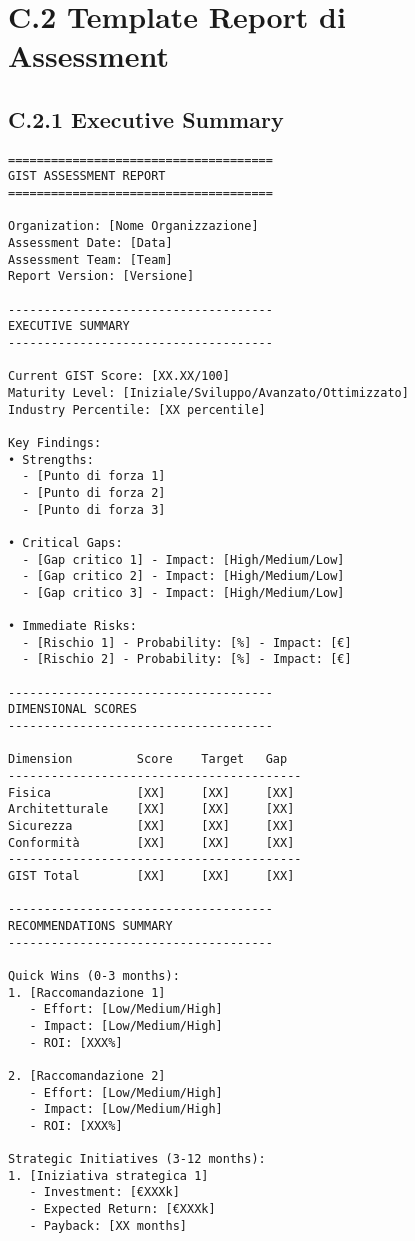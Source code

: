 \section{C.2 Template Report di Assessment}

\subsection{C.2.1 Executive Summary}

\begin{verbatim}
=====================================
GIST ASSESSMENT REPORT
=====================================

Organization: [Nome Organizzazione]
Assessment Date: [Data]
Assessment Team: [Team]
Report Version: [Versione]

-------------------------------------
EXECUTIVE SUMMARY
-------------------------------------

Current GIST Score: [XX.XX/100]
Maturity Level: [Iniziale/Sviluppo/Avanzato/Ottimizzato]
Industry Percentile: [XX percentile]

Key Findings:
• Strengths:
  - [Punto di forza 1]
  - [Punto di forza 2]
  - [Punto di forza 3]

• Critical Gaps:
  - [Gap critico 1] - Impact: [High/Medium/Low]
  - [Gap critico 2] - Impact: [High/Medium/Low]
  - [Gap critico 3] - Impact: [High/Medium/Low]

• Immediate Risks:
  - [Rischio 1] - Probability: [%] - Impact: [€]
  - [Rischio 2] - Probability: [%] - Impact: [€]

-------------------------------------
DIMENSIONAL SCORES
-------------------------------------

Dimension         Score    Target   Gap
-----------------------------------------
Fisica            [XX]     [XX]     [XX]
Architetturale    [XX]     [XX]     [XX]
Sicurezza         [XX]     [XX]     [XX]
Conformità        [XX]     [XX]     [XX]
-----------------------------------------
GIST Total        [XX]     [XX]     [XX]

-------------------------------------
RECOMMENDATIONS SUMMARY
-------------------------------------

Quick Wins (0-3 months):
1. [Raccomandazione 1]
   - Effort: [Low/Medium/High]
   - Impact: [Low/Medium/High]
   - ROI: [XXX%]

2. [Raccomandazione 2]
   - Effort: [Low/Medium/High]
   - Impact: [Low/Medium/High]
   - ROI: [XXX%]

Strategic Initiatives (3-12 months):
1. [Iniziativa strategica 1]
   - Investment: [€XXXk]
   - Expected Return: [€XXXk]
   - Payback: [XX months]


\end{verbatim}

